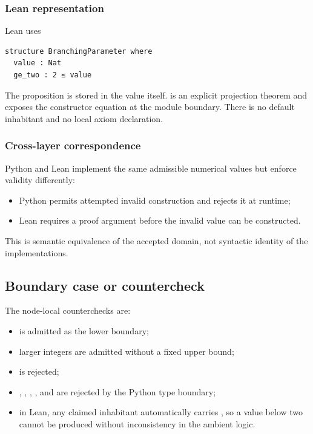 \subsubsection{Lean representation}\label{lean-representation}

Lean uses

\begin{verbatim}
structure BranchingParameter where
  value : Nat
  ge_two : 2 ≤ value
\end{verbatim}

The proposition is stored in the value itself. \texttt{\protect{}} is an
explicit projection theorem and \texttt{\protect{}} exposes the
constructor equation at the module boundary. There is no default
inhabitant and no local axiom declaration.

\subsubsection{Cross-layer
correspondence}\label{cross-layer-correspondence}

Python and Lean implement the same admissible numerical values but
enforce validity differently:

\begin{itemize}
\tightlist
\item
  Python permits attempted invalid construction and rejects it at
  runtime;
\item
  Lean requires a proof argument before the invalid value can be
  constructed.
\end{itemize}

This is semantic equivalence of the accepted domain, not syntactic
identity of the implementations.

\subsection{Boundary case or
countercheck}\label{boundary-case-or-countercheck}

The node-local counterchecks are:

\begin{itemize}
\tightlist
\item
  \texttt{\protect{}} is admitted as the lower boundary;
\item
  larger integers are admitted without a fixed upper bound;
\item
  \texttt{\protect{}} is rejected;
\item
  \texttt{\protect{}}, \texttt{\protect{}}, \texttt{\protect{}}, \texttt{\protect{}}, and
  \texttt{\protect{}} are rejected by the Python type boundary;
\item
  in Lean, any claimed inhabitant automatically carries
  \texttt{\protect{}}, so a value below two cannot be produced without
  inconsistency in the ambient logic.
\end{itemize}

